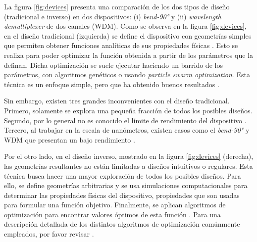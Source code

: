 La figura \ref{fig:devices} presenta una comparación de los dos tipos de diseño
(tradicional e inverso) en dos dispositivos: (i) \emph{bend-90°} y (ii)
\emph{wavelength demultiplexer} de dos canales (WDM).
Como se observa en la figura \ref{fig:devices}, en el diseño tradicional (izquierda) se define el dispositivo con geometrías simples que permiten obtener funciones analíticas de sus propiedades físicas \citep{Hughes2016, Song2008}. 
Esto se realiza para poder optimizar la función obtenida a partir de los parámetros que la definan. 
Dicha optimización se suele ejecutar haciendo un barrido de los parámetros, con algoritmos genéticos o usando \emph{particle swarm optimization}. 
Esta técnica es un enfoque simple, pero que ha obtenido buenos resultados
\citep{Su2020}. 


Sin embargo, existen tres grandes inconvenientes con el diseño tradicional. 
Primero, solamente se explora una pequeña fracción de todos los posibles diseños.
Segundo, por lo general no es conocido el límite de rendimiento del dispositivo
\citep{Molesky2018}.
Tercero, al trabajar en la escala de nanómetros, existen casos como el
\emph{bend-90°} y WDM que presentan un bajo rendimiento \citep{Su2020}.



Por el otro lado, en el diseño inverso, mostrado en la figura \ref{fig:devices}
(derecha), las geometrías resultantes no están limitadas a diseños intuitivos o regulares.
Esta técnica busca hacer una mayor exploración de todos los posibles diseños.
Para ello, se define geometrías arbitrarias y se usa simulaciones
computacionales para determinar las propiedades físicas del dispositivo,
propiedades que son usadas para formular una función objetivo.
Finalmente, se aplican algoritmos de optimización para encontrar valores
óptimos de esta función \citep{Molesky2018, Su2020}.
Para una descripción detallada de los distintos algoritmos de optimización
comúnmente empleados, por favor revisar \cite{Schneider2019, Elsawy2020, Campbell2019}.

